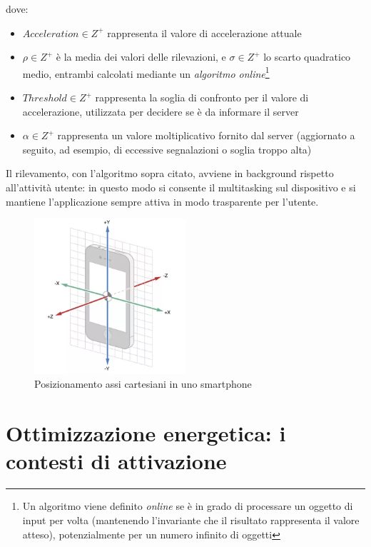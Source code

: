 \documentclass[a4paper,10pt]{memoir}
\begin{document}
dove: \begin{itemize}
\item $Acceleration \in Z^+$ rappresenta il valore di accelerazione attuale
\item $\rho \in Z^+$ è la media dei valori delle rilevazioni, e $\sigma \in Z^+$ lo scarto quadratico medio, entrambi calcolati mediante un \textit{algoritmo online}\footnote{Un algoritmo viene definito \textit{online} se è in grado di processare un oggetto di input per volta (mantenendo l'invariante che il risultato rappresenta il valore atteso), potenzialmente per un numero infinito di oggetti}
\item $Threshold \in Z^+$ rappresenta la soglia di confronto per il valore di accelerazione, utilizzata per decidere se è da informare il server
\item $\alpha \in Z^+$ rappresenta un valore moltiplicativo fornito dal server (aggiornato a seguito, ad esempio, di eccessive segnalazioni o soglia troppo alta)
\end{itemize}

Il rilevamento, con l'algoritmo sopra citato, avviene in background rispetto all'attività utente: in questo modo si consente il multitasking sul dispositivo e si mantiene l'applicazione sempre attiva in modo trasparente per l'utente.

\begin{figure}[ht]
\centering
\label{fig:scsaxes}
\caption{Posizionamento assi cartesiani in uno smartphone}
\includegraphics[width=0.5\textwidth]{introduzione/smartphone_axes}
\end{figure}

\chapter{Ottimizzazione energetica: i contesti di attivazione}
\end{document}

